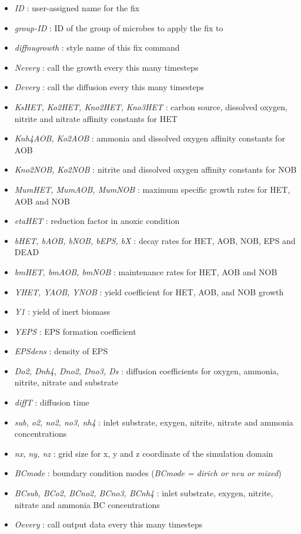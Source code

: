 \documentclass[11pt,a4paper,openright]{article}
\begin{document}
\begin{itemize}
\item
	{\it ID }: user-assigned name for the fix
\item
	{\it group-ID }: ID of the group of microbes to apply the fix to
\item
	{\it diffnugrowth }: style name of this fix command
\item
	{\it Nevery }: call the growth every this many timesteps	
\item
	{\it Devery }: call the diffusion every this many timesteps
\item
	{\it KsHET, Ko2HET, Kno2HET, Kno3HET }: carbon source, dissolved oxygen, nitrite and nitrate affinity constants for HET
\item
	{\it Knh4AOB, Ko2AOB }: ammonia and dissolved oxygen affinity constants for AOB
\item
	{\it Kno2NOB, Ko2NOB }: nitrite and dissolved oxygen affinity constants for NOB
\item
	{\it MumHET, MumAOB, MumNOB }: maximum specific growth rates for HET, AOB and NOB
\item
	{\it etaHET }: reduction factor in anoxic condition
\item
	{\it bHET, bAOB, bNOB, bEPS, bX }: decay rates for HET, AOB, NOB, EPS and DEAD
\item
	{\it bmHET, bmAOB, bmNOB }: maintenance rates for HET, AOB and NOB
\item
	{\it YHET, YAOB, YNOB }: yield coefficient for HET, AOB, and NOB growth
\item
	{\it Y1 }: yield of inert biomass
\item
	{\it YEPS }: EPS formation coefficient
\item
	{\it EPSdens }: density of EPS
\item
	{\it Do2, Dnh4, Dno2, Dno3, Ds }: diffusion coefficients for oxygen, ammonia, nitrite, nitrate and substrate 
\item
	{\it diffT }: diffusion time 
\item
	{\it sub, o2, no2, no3, nh4 }: inlet substrate, exygen, nitrite, nitrate and ammonia concentrations
\item
	{\it nx, ny, nz }: grid size for x, y and z coordinate of the simulation domain 
\item
	{\it BCmode }: boundary condition modes ({\it BCmode = dirich or neu or mixed})
\item
	{\it BCsub, BCo2, BCno2, BCno3, BCnh4 }: inlet substrate, exygen, nitrite, nitrate and ammonia BC concentrations
\item	
	{\it Oevery }: call output data every this many timesteps
\end{itemize}
\end{document}
